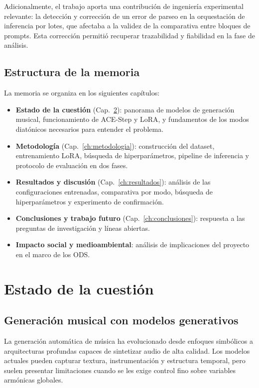 \documentclass[%
    school=etsisi,%
    type=pfg,%
    degree=61CD,%
]{upm-report}
\begin{document}
Adicionalmente, el trabajo aporta una contribuci\'on de ingenier\'ia experimental relevante: la detecci\'on y correcci\'on de un error de parseo en la orquestaci\'on de inferencia por lotes, que afectaba a la validez de la comparativa entre bloques de prompts. Esta correcci\'on permiti\'o recuperar trazabilidad y fiabilidad en la fase de an\'alisis.

\section{Estructura de la memoria}

La memoria se organiza en los siguientes cap\'itulos:

\begin{itemize}
    \item \textbf{Estado de la cuesti\'on} (Cap.~\ref{ch:estado-cuestion}): panorama de modelos de generaci\'on musical, funcionamiento de ACE-Step y LoRA, y fundamentos de los modos diat\'onicos necesarios para entender el problema.
    \item \textbf{Metodolog\'ia} (Cap.~\ref{ch:metodologia}): construcci\'on del dataset, entrenamiento LoRA, b\'usqueda de hiperpar\'ametros, pipeline de inferencia y protocolo de evaluaci\'on en dos fases.
    \item \textbf{Resultados y discusi\'on} (Cap.~\ref{ch:resultados}): an\'alisis de las configuraciones entrenadas, comparativa por modo, b\'usqueda de hiperpar\'ametros y experimento de confirmaci\'on.
    \item \textbf{Conclusiones y trabajo futuro} (Cap.~\ref{ch:conclusiones}): respuesta a las preguntas de investigaci\'on y l\'ineas abiertas.
    \item \textbf{Impacto social y medioambiental}: an\'alisis de implicaciones del proyecto en el marco de los ODS.
\end{itemize}

\chapter{Estado de la cuesti\'on}
\label{ch:estado-cuestion}

\section{Generaci\'on musical con modelos generativos}

La generaci\'on autom\'atica de m\'usica ha evolucionado desde enfoques simb\'olicos a arquitecturas profundas capaces de sintetizar audio de alta calidad. Los modelos actuales pueden capturar textura, instrumentaci\'on y estructura temporal, pero suelen presentar limitaciones cuando se les exige control fino sobre variables arm\'onicas globales.
\end{document}
